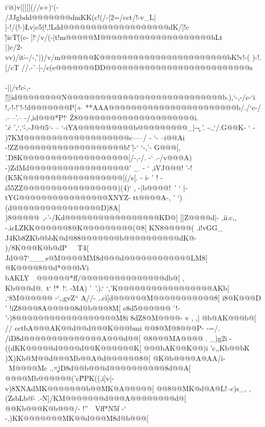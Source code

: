 \iffalse



i`it)v|[[[[(//s+)`(-\\/JJgbdd@@@@@@@dmKK(c!(/-[2=/cct/!-v\!_L\)|
]-!/(!-)\L\)v|c5(!,!Ldd@@@@@@@@@@@@@@@@@@@dK/]!c\\\v|i\/cT\v((c-
]!`/v\//(-|t\VvcL!m@@@@@M@@@@@@@@@@@@@@@@@@@@bLt\\|)c/2-vv)/it\.
--/-,\,\v\,|)/v/m@@@@@@K@@@@@@@@@@@@@@@@@@@@@@@bK!v!-( )-!.[/cT
//.\--'--|-/c(e@@@@@@@DD@@@@@@@@@@@@@@@@@@@@@@@@@@s\\\\-||/v!c\.
-,-|\`||\-\/id@@@@@@@@N@@@@@@@@@@@@@@@@@@@@@@@@@@@@b.),`-,-/c-`i
!,\!-!-!'!-!d@@@@@@@P[+~**AAA@@@@@@@@@@@@@@@@@@@@@@@b/./`c-/.\7-
--'.-- -/,id@@@*P!`          \'Z8@@@@@@@@@@@@@@@@@@@@@i.\\'.\.c
',`,`\'-,-J@@5`-           -- `-iYA@@@@@@@@@@b@@@@@@@@@_\-|-\c-
'. -.,`/.G@@K- `               - )7KM@@@@@@@@@@@@@@@@@@@c-----/
- `-  --i@@Ai                    -!ZZ@@@@@@@@@@@@@@@@@@@b! \`|-`
 `-,'- G@@@[,                    '.D8K@@@@@@@@@@@@@@@@@@@[/-,-/.
-` .-/v@@@A)                      -)ZdMd@@@@@@@@@@@@@@@@@@\' _\
- ` ,iVJ@@@!                     '-!(K5K@@@@@@@@@@@@@@@@@@[(/s[.
  - i\G@@@Z-                    ' ! -i55ZZ@@@@@@@@@@@@@@@@@)(4)`
 , -|b@@@@!\                     '  ` |-tYG@@@@@@@@@@@@@@@@XNYZ-
   tt@@@@A-,                        '  `)(d@@@@@@@@@@@@@@@@D)8A[
   )8@@@@@\                         ,-'-/Kd@@@@@@@@@@@@@@@@@KD@[
  ]]Z@@@@d|-              ,ii.c,, -.icLZKK@@@@@@8@K@@@@@@@@@(@8[
  KN8@@@@@( .i!vGG_      J4Kb8ZKb@bbK@d@88@@@@@@@b@@@@@@@@@@dK@-
 )/8K@@@K@b@dP~~~T4(    Jd@@7`___s@M@@@@MM8d@@@d@@@@@@@@@@@@LM8[
\!48@K@@@@8@@d*@@@bVi   bAKLY~~@@@@@@*ff/\NM8@@@@@@@@@@@@@@@db@[
,\\Kb@@@d@.~t` !*~!`.  -MA)    '~'.).` `,'K@@@@@@@@@@@@@@@@@AKb[
,`8M@@@@@@ -`,,gvZ``    A//-  ..c\+\`    i]d@@@@@@M@@@@@@@@@@@8[
i\@8@K@@@D              \!'             !iZ8@@@8A@@@@@8d@b@@@8M[
e8d5@@@@@@             '!-             '-)8@@@@@@@@@@@@@@@@@@M8i
8dZ8@M@@@@-             v  ,          ,\tK@@@@@@@@@@@@A@@@@@@Z2|
@b@AK@@@b@[              //           cctbA@@@AK@@d@@d@@@K@@@bmi
@@8@M@8@@@P-            -=/.         /iD8d@@@@@@@@@@@@@@A@@@d@@[
@8@@@MA@@@@\-      .   _)g2i        -((dKK@@@@@d@@@@d@@K@@@@@@K[
@@@bAK@@K@@)i     'c,,Kb@@bK       )X)Kb@M@@d@@@Mb@@A@d@@@@@@8@[
@K@b@@@@A@AA/i-     ~M@@@@Mc    .,\c=)D8d@@b@@@d@@@@@@@@@@8d@@A[
@@@@Mb@@@@@@('c\`     PPK((,i]v|-\-v)8XNAdMK@@@@@@@b@@MK@A@@@@@[
@@8@@MK@d@A@L!--c)s_, ,(ZsbLb@\`- .-N]/KM@@@@@@@d@@@A@@@@@@@@d@[
@@Kb@@@K@b@@@/-  !''~~Vff*N5f -` -,\))KK@@@@@@@MK@@d@@@M8d@b@@@[
